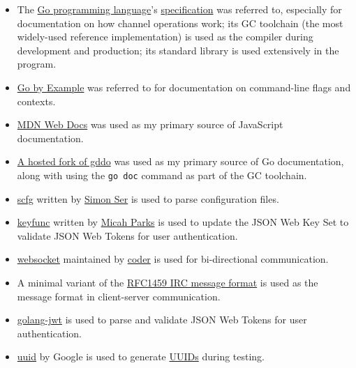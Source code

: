 \begin{itemize}
	\item The \href{https://go.dev}{Go programming language}'s
		\href{https://go.dev/ref/spec}{specification} was referred to,
		especially for documentation on how channel operations work;
		its GC toolchain (the most widely-used reference
		implementation) is used as the compiler during development and
		production; its standard library is used extensively in the
		program.

	\item \href{https://gobyexample.com}{Go by Example} was referred to for
		documentation on command-line flags and contexts.

	\item \href{https://developer.mozilla.org/en-US/}{MDN Web Docs} was
		used as my primary source of JavaScript documentation.

	\item \href{https://godocs.io}{A hosted fork of gddo} was used as my
		primary source of Go documentation, along with using the
		\texttt{go doc} command as part of the GC toolchain.

	\item \href{https://git.sr.ht/~emersion/go-scfg}{scfg}
		written by \href{https://emersion.fr}{Simon Ser} is used to
		parse configuration files.

	\item \href{https://github.com/MicahParks/keyfunc}{keyfunc}
		written by \href{https://micahparks.com/}{Micah Parks} is used
		to update the JSON Web Key Set to validate JSON Web Tokens for
		user authentication.

	\item \href{https://github.com/coder/websocket}{websocket} maintained
		by \href{https://coder.com/}{coder} is used for bi-directional
		communication.

	\item A minimal variant of the
		\href{https://www.rfc-editor.org/rfc/rfc1459#section-2.3}{RFC1459
		IRC message format} is used as the message format in
		client-server communication.
	
	\item \href{https://github.com/golang-jwt/jwt}{golang-jwt} is used to
		parse and validate JSON Web Tokens for user authentication.

	\item \href{https://github.com/google/uuid}{uuid} by Google is used to
		generate
		\href{https://www.rfc-editor.org/rfc/rfc9562.html}{UUIDs}
		during testing.
	

\end{itemize}
